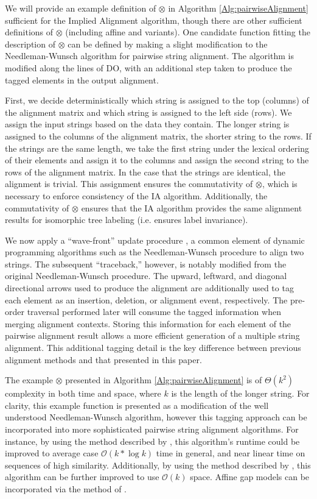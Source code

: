 \documentclass{bmcart}
\begin{document}
We will provide an example definition of $\otimes$ in Algorithm \ref{Alg:pairwiseAlignment} sufficient for the Implied Alignment algorithm, though there are other sufficient definitions of $\otimes$ (including affine and \cite{Ukkonen1985} variants).
One candidate function fitting the description of $\otimes$ can be defined by making a slight modification to the Needleman-Wunsch \citep{Needleman1970} algorithm for pairwise string alignment.
The algorithm is modified along the lines of DO, with an additional step taken to produce the tagged elements in the output alignment.

First, we decide deterministically which string is assigned to the top (columns) of the alignment matrix and which string is assigned to the left side (rows).
We assign the input strings based on the data they contain.
The longer string is assigned to the columns of the alignment matrix, the shorter string to the rows.
If the strings are the same length, we take the first string under the lexical ordering of their elements and assign it to the columns and assign the second string to the rows of the alignment matrix. 
In the case that the strings are identical, the alignment is trivial.
This assignment ensures the commutativity of $\otimes$, which is necessary to enforce consistency of the IA algorithm.
Additionally, the commutativity of $\otimes$ ensures that the IA algorithm provides the same alignment results for isomorphic tree labeling (i.e. ensures label invariance).

We now apply a ``wave-front'' update procedure \citep{cormen2001}, a common element of dynamic programming algorithms such as the Needleman-Wunsch procedure to align two strings.
The subsequent ``traceback,'' however, is notably modified from the original Needleman-Wunsch procedure.
The upward, leftward, and diagonal directional arrows used to produce the alignment are additionally used to tag each element as an insertion, deletion, or alignment event, respectively. 
The pre-order traversal performed later will consume the tagged information when merging alignment contexts.
Storing this information for each element of the pairwise alignment result allows a more efficient generation of a multiple string alignment.
This additional tagging detail is the key difference between previous alignment methods and that presented in this paper.

The example $\otimes$ presented in Algorithm \ref{Alg:pairwiseAlignment}  is of $\Theta\left( k^2 \right)$ complexity in both time and space, where $k$ is the length of the longer string.
For clarity, this example function is presented as a modification of the well understood Needleman-Wunsch algorithm, however this tagging approach can be incorporated into more sophisticated pairwise string alignment algorithms.
For instance, by using the method described by \cite{Ukkonen1985}, this algorithm's runtime could be improved to average case $\mathcal{O}\left( k * \log k \right)$ time in general, and near linear time on sequences of high similarity.
Additionally, by using the method described by \cite{Hirschberg1975}, this algorithm can be further improved to use $\mathcal{O}\left( k \right)$ space.
Affine gap models can be incorporated via the method of \cite{VaronandWheeler2012}.
\end{document}
